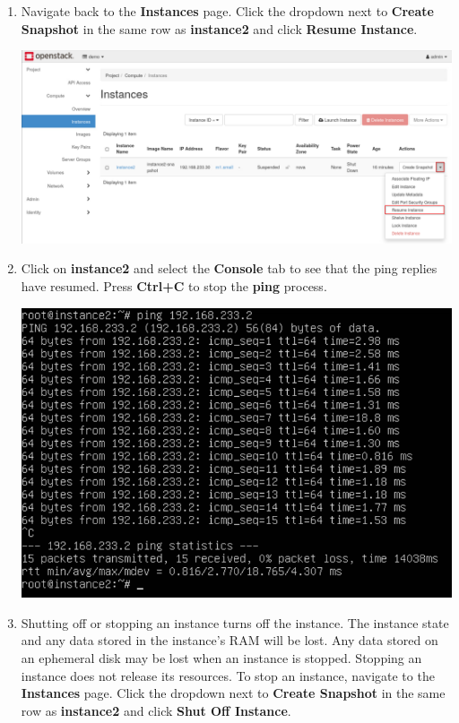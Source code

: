 \documentclass[letterpaper, 12pt]{article}
\begin{document}
\begin{enumerate}
    \item Navigate back to the \textbf{Instances} page. Click the dropdown next to \textbf{Create Snapshot} in the same
    row as \textbf{instance2} and click \textbf{Resume Instance}.

    \begin{center}
        \includegraphics[width=\linewidth]{images/part3/step10.png}
    \end{center}

    \item Click on \textbf{instance2} and select the \textbf{Console} tab to see that the ping replies have resumed.
    Press \textbf{Ctrl+C} to stop the \textbf{ping} process.

    \begin{center}
        \includegraphics[width=\linewidth]{images/part3/step11.png}
    \end{center}

    \item Shutting off or stopping an instance turns off the instance. The instance state and any data stored in the
    instance's RAM will be lost. Any data stored on an ephemeral disk may be lost when an instance is stopped. Stopping
    an instance does not release its resources. To stop an instance, navigate to the \textbf{Instances} page. Click the
    dropdown next to \textbf{Create Snapshot} in the same row as \textbf{instance2} and click \textbf{Shut Off
    Instance}.


\end{enumerate}
\end{document}
